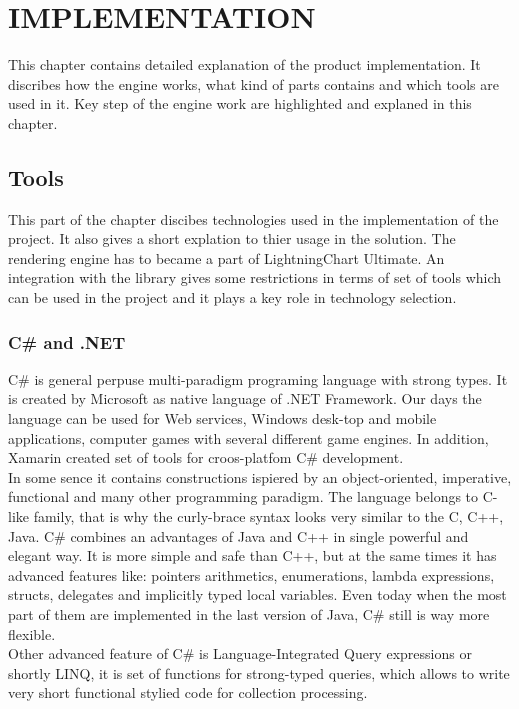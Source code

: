 \documentclass[twoside, english, 11pt]{report}
\begin{document}
\chapter{IMPLEMENTATION}
This chapter contains detailed explanation of the product implementation. It discribes how the engine works, what kind of parts contains and which tools are used in it. Key step of the engine work are highlighted and explaned in this chapter.
\section{Tools}
This part of the chapter discibes technologies used in the implementation of the project. It also gives a short explation to thier usage in the solution. The rendering engine has to became a part of LightningChart Ultimate. An integration with the library gives some restrictions in terms of set of tools which can be used in the project and it plays a key role in technology selection.
\subsection{C\# and .NET}
C\# is general perpuse  multi-paradigm programing language with strong types. It is created by Microsoft as native language of .NET Framework. Our days the language can be used for Web services, Windows desk-top and mobile applications, computer games with several different game engines. In addition, Xamarin created set of tools for croos-platfom C\# development.\\

In some sence it contains constructions ispiered by an object-oriented, imperative, functional and many other programming paradigm. The language belongs to C-like family, that is why the curly-brace syntax looks very similar to the C, C++, Java.  C\# combines an advantages of Java and C++ in single powerful and elegant way. It is more simple and safe than C++, but at the same times it has advanced features like: pointers arithmetics, enumerations, lambda expressions, structs, delegates and implicitly typed local variables. Even today when the most part of them are implemented in the last version of Java, C\# still is way more flexible.\\

Other advanced feature of C\# is Language-Integrated Query expressions or shortly LINQ, it is set of functions for strong-typed queries, which allows to write very short functional stylied code for collection processing.\\
\end{document}
